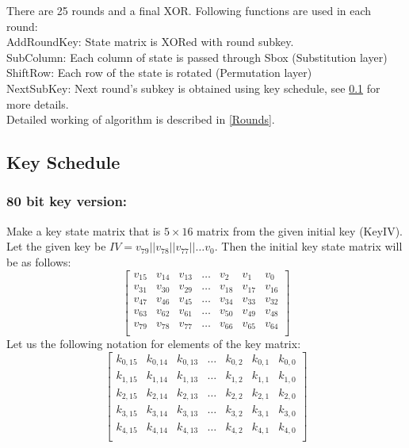 \documentclass[final]{transcrypto}
\begin{document}
There are 25 rounds and a final XOR. Following functions are used in each round:\\
AddRoundKey: State matrix is XORed with round subkey.\\
SubColumn: Each column of state is passed through Sbox (Substitution layer)\\
ShiftRow: Each row of the state is rotated (Permutation layer)\\
NextSubKey: Next round's subkey is obtained using key schedule, see \ref{KeySchedule} for more details.\\
Detailed working of algorithm is described in \ref{Rounds}.
\subsection{Key Schedule}
\label{KeySchedule}
\subsubsection{80 bit key version:}
Make a key state matrix that is $5\times 16$ matrix from the given initial key (KeyIV).\\
Let the given key be $IV = v_{79}||v_{78}||v_{77}||\dots v_{0}$. Then the initial key state matrix will be as follows:
$$
\begin{bmatrix}
v_{15} & v_{14} & v_{13} & \dots & v_{2} & v_{1} & v_{0}\\
v_{31} & v_{30} & v_{29} & \dots & v_{18} & v_{17} & v_{16}\\
v_{47} & v_{46} & v_{45} & \dots & v_{34} & v_{33} & v_{32}\\
v_{63} & v_{62} & v_{61} & \dots & v_{50} & v_{49} & v_{48}\\
v_{79} & v_{78} & v_{77} & \dots & v_{66} & v_{65} & v_{64}\\
\end{bmatrix}
$$
Let us the following notation for elements of the key matrix:
$$
\begin{bmatrix}
k_{0,15} & k_{0,14} & k_{0,13} & \dots & k_{0,2} & k_{0,1} & k_{0,0}\\
k_{1,15} & k_{1,14} & k_{1,13} & \dots & k_{1,2} & k_{1,1} & k_{1,0}\\
k_{2,15} & k_{2,14} & k_{2,13} & \dots & k_{2,2} & k_{2,1} & k_{2,0}\\
k_{3,15} & k_{3,14} & k_{3,13} & \dots & k_{3,2} & k_{3,1} & k_{3,0}\\
k_{4,15} & k_{4,14} & k_{4,13} & \dots & k_{4,2} & k_{4,1} & k_{4,0}\\
\end{bmatrix}
$$
\end{document}
